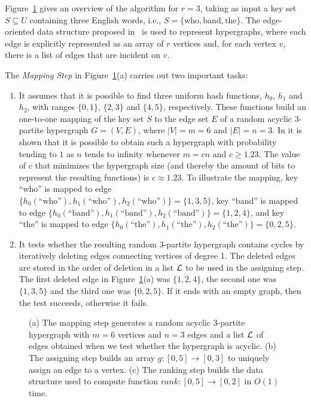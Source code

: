 Figure~\ref{fig:overview} gives an overview of the algorithm for $r=3$, 
taking as input a key set $S \subseteq U$ containing three English words, i.e.,  $S=\{\mathrm{who},\mathrm{band},\mathrm{the}\}$.
The edge-oriented data structure proposed in~\cite{e87} is used 
to represent hypergraphs, where each edge is explicitly represented
as an array of $r$ vertices and, for each vertex $v$,
there is a list of edges that are incident on $v$.

The {\em Mapping Step} in Figure~\ref{fig:overview}(a) carries out two 
important tasks:
\begin{enumerate}
\item 
It assumes that it is possible to find three uniform 
hash functions, $h_0$, $h_1$ and $h_2$, with ranges $\{0,1\}$, $\{2,3\}$ and $\{4,5\}$, respectively.
These functions build an one-to-one mapping of the key set $S$ to the edge set $E$
of a random acyclic  
$3$-partite hypergraph $G=(V,E)$, where $|V|=m=6$ and $|E|=n=3$.
In \cite{b08,bpz07} it is shown that
it is possible to obtain such a hypergraph with probability tending to $1$ as $n$
tends to infinity
whenever $m=cn$ and $c \ge 1.23$. The value of $c$ that minimizes the hypergraph size 
(and thereby the amount of bits to represent the resulting functions) is $c \approx 1.23$.
To illustrate the mapping, 
key ``who'' is mapped to edge $\{h_0(\text{``who''}),h_1(\text{``who''}),h_2(\text{``who''})\}=\{1,3,5\}$, 
key ``band'' is mapped to edge $\{h_0(\text{``band''}),h_1(\text{``band''}),h_2(\text{``band''})\}=\{1,2,4\}$, and 
key ``the'' is mapped to edge $\{h_0(\text{``the''}),h_1(\text{``the''}),h_2(\text{``the''})\}=\{0,2,5\}$. 
\item
It tests whether the resulting random $3$-partite hypergraph contains cycles
by iteratively deleting edges connecting vertices of degree 1.
The deleted edges are stored in the order of deletion in a list $\cal L$
to be used in the assigning step. 
The first deleted edge in Figure~\ref{fig:overview}(a)
was $\{1,2,4\}$, the second one was $\{1,3,5\}$ and 
the third one was $\{0,2,5\}$.
If it ends with an empty graph, then the test succeeds,
otherwise it fails. 
\end{enumerate}


\begin{figure}
\begin{center}
\end{center}
\caption{(a) The mapping step generates a random acyclic $3$-partite hypergraph with $m=6$ vertices and $n=3$ edges
and a list $\cal L$ of edges obtained when we test whether the hypergraph is acyclic.
(b) The assigning step builds an array $g:[0,5] \to [0,3]$ to uniquely
assign an edge to a vertex. (c) The ranking step builds the data structure used to 
compute function $\mathit{rank}: [0,5] \to [0,2]$ in $O(1)$ time.~~~~}
\label{fig:overview}
\end{figure}



